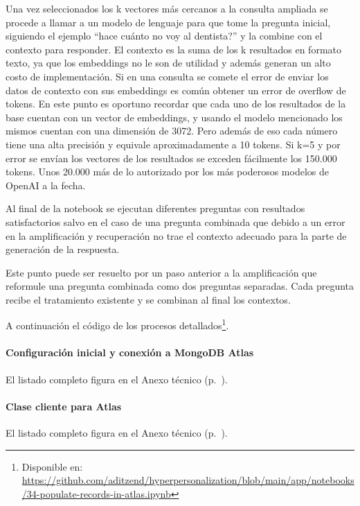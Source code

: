 Una vez seleccionados los k vectores más cercanos a la consulta ampliada se procede a llamar a un modelo de lenguaje para que tome la pregunta inicial, siguiendo el ejemplo ``hace cuánto no voy al dentista?'' y la combine con el contexto para responder. El contexto es la suma de los k resultados en formato texto, ya que los embeddings no le son de utilidad y además generan un alto costo de implementación. Si en una consulta se comete el error de enviar los datos de contexto con sus embeddings es común obtener un error de overflow de tokens. En este punto es oportuno recordar que cada uno de los resultados de la base cuentan con un vector de embeddings, y usando el modelo mencionado los mismos cuentan con una dimensión de 3072. Pero además de eso cada número tiene una alta precisión y equivale aproximadamente a 10 tokens. Si k=5 y por error se envían los vectores de los resultados se exceden fácilmente los 150.000 tokens. Unos 20.000 más de lo autorizado por los más poderosos modelos de OpenAI a la fecha.

Al final de la notebook se ejecutan diferentes preguntas con resultados satisfactorios salvo en el caso de una pregunta combinada que debido a un error en la amplificación y recuperación no trae el contexto adecuado para la parte de generación de la respuesta.

Este punto puede ser resuelto por un paso anterior a la amplificación que reformule una pregunta combinada como dos preguntas separadas. Cada pregunta recibe el tratamiento existente y se combinan al final los contextos.

A continuación el código de los procesos detallados\footnote{Disponible en: \url{https://github.com/aditzend/hyperpersonalization/blob/main/app/notebooks/34-populate-records-in-atlas.ipynb}}.

\paragraph{Configuración inicial y conexión a MongoDB Atlas}

El listado completo figura en el Anexo técnico (p.~\pageref{anexo:code-4-4-2-2}).

\paragraph{Clase cliente para Atlas}

El listado completo figura en el Anexo técnico (p.~\pageref{anexo:code-4-4-2-3}).

